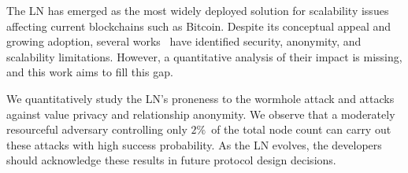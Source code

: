 The LN has emerged as the most widely deployed solution for scalability issues affecting current blockchains such as Bitcoin.
Despite its conceptual appeal and growing adoption, several works~\cite{Malavolta2017, Malavolta2019} have identified security, anonymity, and scalability limitations.
However, a quantitative analysis of their impact is missing, and this work aims to fill this gap.

We quantitatively study the LN's proneness to the wormhole attack and attacks against value privacy and relationship anonymity.
We observe that a moderately resourceful adversary controlling only $2\%$~of the total node count can carry out these attacks with high success probability.
As the LN evolves, the developers should acknowledge these results in future protocol design decisions.